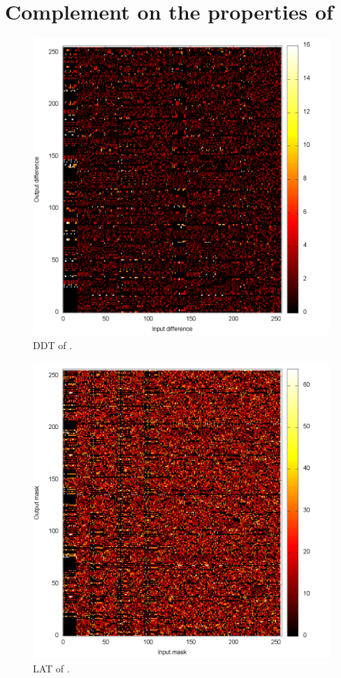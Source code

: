 \section{Complement on the properties of \littlunOne}

\begin{figure}[ht]
\centering
\includegraphics[scale=0.35]{../II_LOTF/littlun/littlun_s1_ddt.png}
\caption{DDT of \littlunOne \label{littDDT}.}
\end{figure}

\begin{figure}[ht]
\centering
\includegraphics[scale=0.35]{../II_LOTF/littlun/littlun_s1_lat.png}
\caption{LAT of \littlunOne \label{littLAT}.}
\end{figure}

